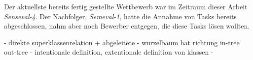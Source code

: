 Der aktuellste bereits fertig gestellte Wettbewerb war im Zeitraum dieser Arbeit \emph{Senseval-4}.
Der Nachfolger, \emph{Semeval-1}, hatte die Annahme von Tasks bereits abgeschlossen, nahm aber noch Bewerber entgegen, die diese Tasks lösen wollten.

\fi
\FloatBarrier



- direkte superklassenrelation + abgeleitete
- wurzelbaum hat richtung in-tree out-tree
- intentionale definition, extentionale definition von klassen
- 